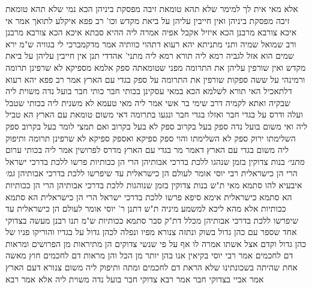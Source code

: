 \documentclass[12pt, openany]{book}
\begin{document}
{אלא מאי אית לך למימר שלא תהא טומאת זיבה מפסקת ביניהן הכא נמי שלא תהא טומאת זיבה מפסקת ביניהן
ואין חייבין עליהן על ביאת מקדש וכו' רב פפא איקלע לתואך  אמר  אי איכא צורבא מרבנן הכא איזיל אקבל אפיה  אמרה ליה ההיא סבתא  איכא הכא צורבא מרבנן ורב שמואל שמיה ותני מתניתא יהא רעוא דתהוי כוותיה 
אמר  מדקמברכי לי בגוויה ש"מ ירא שמים הוא  אזל לגביה  רמא ליה תורא רמא ליה מתני' אהדדי  תנן  אין חייבין עליהן על ביאת מקדש ואין שורפין עליהן את התרומה מפני שטומאתה ספק  אלמא מספיקא לא שרפינן תרומה
ורמינהי  על ששה ספקות שורפין את התרומה על ספק בגדי עם הארץ 
אמר רב פפא  יהא רעוא דלתאכיל האי תורא לשלמא הכא במאי עסקינן בכותי חבר 
כותי חבר בועל נדה משוית ליה 
שבקיה ואתא לקמיה דרב שימי בר אשי  אמר ליה  מאי טעמא לא משנית ליה  בכותי שטבל ועלה ודרס על בגדי חבר ואזלו בגדי חבר ונגעו בתרומה 
דאי משום טומאת עם הארץ הא טביל ליה ואי משום בועל נדה ספק בעל בקרוב ספק לא בעל בקרוב 
ואם תמצי לומר בעל בקרוב ספק השלימתו ירוק ספק לא השלימתו והוי ספק ספיקא ואספק ספיקא לא שרפינן תרומה 
ותיפוק ליה משום בגדי עם הארץ דאמר מר  בגדי עם הארץ מדרס לפרושין  אמר ליה  בכותי ערום
{\large\emph{מתני׳}} בנות צדוקין בזמן שנהגו ללכת בדרכי אבותיהן הרי הן ככותיות פרשו ללכת בדרכי ישראל הרי הן כישראלית רבי יוסי אומר  לעולם הן כישראלית עד שיפרשו ללכת בדרכי אבותיהן
{\large\emph{גמ׳}} איבעיא להו סתמא מאי  ת"ש  בנות צדוקין בזמן שנוהגות ללכת בדרכי אבותיהן הרי הן ככותיות הא סתמא כישראלית  אימא סיפא  פרשו ללכת בדרכי ישראל הרי הן כישראלית הא סתמא ככותיות  אלא מהא ליכא למשמע מיניה 
ת"ש דתנן ר' יוסי אומר  לעולם הן כישראלית עד שיפרשו ללכת בדרכי אבותיהן  מכלל דת"ק סבר  סתמא ככותיות ש"מ
תנו רבנן  מעשה בצדוקי אחד שספר עם כהן גדול בשוק ונתזה צנורא מפיו ונפלה לכהן גדול על בגדיו והוריקו פניו של כהן גדול וקדם אצל אשתו 
אמרה לו  אף על פי שנשי צדוקים הן מתיראות מן הפרושים ומראות דם לחכמים 
אמר רבי יוסי  בקיאין אנו בהן יותר מן הכל והן מראות דם לחכמים חוץ מאשה אחת שהיתה בשכונתינו שלא הראת דם לחכמים ומתה 
ותיפוק ליה משום צנורא דעם הארץ  אמר אביי  בצדוקי חבר  אמר רבא  צדוקי חבר בועל נדה משוית ליה  אלא אמר רבא}
\end{document}
